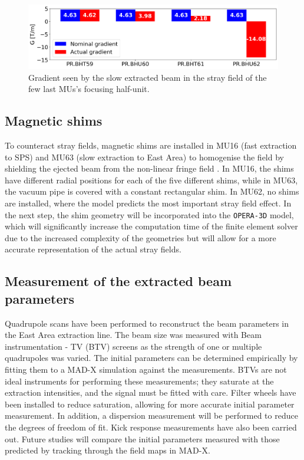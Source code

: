 \documentclass[a4paper,
               biblatex,     %
               keeplastbox,   %
               ]{jacow}
\begin{document}
\begin{figure}[!htb]
   \centering
   \includegraphics*[width=1.0\columnwidth]{MOPOTK030_f7.png}
   \caption{Gradient seen by the slow extracted beam in the stray field of the few last MUs's focusing half-unit.}
   \label{fig:stray field gradients}
\end{figure}

\subsection{Magnetic shims}

To counteract stray fields, magnetic shims are installed in MU16 (fast extraction to SPS) and MU63 (slow extraction to East Area) to homogenise the field by shielding the ejected beam from the non-linear fringe field \cite{zickler_influence_nodate}. In MU16, the shims have different radial positions for each of the five different shims, while in MU63, the vacuum pipe is covered with a constant rectangular shim. In MU62, no shims are installed, where the model predicts the most important stray field effect. In the next step, the shim geometry will be incorporated into the \texttt{OPERA-3D} model, which will significantly increase the computation time of the finite element solver due to the increased complexity of the geometries but will allow for a more accurate representation of the actual stray fields.

\subsection{Measurement of the extracted beam parameters}

Quadrupole scans have been performed to reconstruct the beam parameters in the East Area extraction line. The beam size was measured with Beam instrumentation - TV (BTV) screens as the strength of one or multiple quadrupoles was varied. The initial parameters can be determined empirically by fitting them to a MAD-X simulation against the measurements. BTVs are not ideal instruments for performing these measurements; they saturate at the extraction intensities, and the signal must be fitted with care. Filter wheels have been installed to reduce saturation, allowing for more accurate initial parameter measurement. In addition, a dispersion measurement will be performed to reduce the degrees of freedom of fit.
Kick response measurements have also been carried out. Future studies will compare the initial parameters measured with those predicted by tracking through the field maps in MAD-X.
\end{document}
